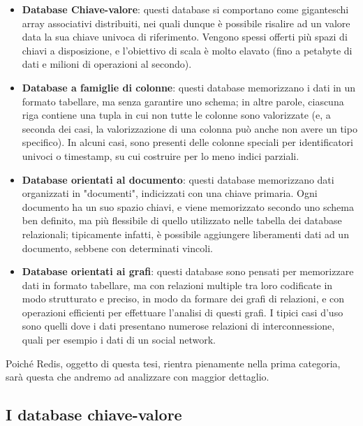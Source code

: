 \begin{itemize}
	\medskip
	\item
	\textbf{Database Chiave-valore}: questi database si comportano come giganteschi array
	associativi distribuiti, nei quali dunque è possibile risalire ad un valore data la
	sua chiave univoca di riferimento. Vengono spessi offerti più spazi di chiavi
	a disposizione, e l'obiettivo di scala è molto elavato (fino a petabyte di dati
	e milioni di operazioni al secondo).

	\item
	\textbf{Database a famiglie di colonne}: questi database memorizzano i dati in un formato
	tabellare, ma senza garantire uno schema; in altre parole, ciascuna riga contiene
	una tupla in cui non tutte le colonne sono valorizzate (e, a seconda dei casi, la
	valorizzazione di una colonna può anche non avere un tipo specifico). In alcuni
	casi, sono presenti delle colonne speciali per identificatori univoci o timestamp,
	su cui costruire per lo meno indici parziali.

	\item
	\textbf{Database orientati al documento}: questi database memorizzano dati organizzati in
	"documenti", indicizzati con una chiave primaria. Ogni documento ha un suo spazio
	chiavi, e viene memorizzato secondo uno schema ben definito, ma più flessibile
	di quello utilizzato nelle tabella dei database relazionali; tipicamente infatti,
	è possibile aggiungere liberamenti dati ad un documento, sebbene con determinati
	vincoli.

	\item
	\textbf{Database orientati ai grafi}: questi database sono pensati per memorizzare dati
	in formato tabellare, ma con relazioni multiple tra loro codificate in modo
	strutturato e preciso, in modo da formare dei grafi di relazioni, e con operazioni
	efficienti per effettuare l'analisi di questi grafi. I tipici casi d'uso sono
	quelli dove i dati presentano numerose relazioni di interconnessione, quali per
	esempio i dati di un social network.
\end{itemize}

Poiché Redis, oggetto di questa tesi, rientra pienamente nella prima categoria, sarà
questa che andremo ad analizzare con maggior dettaglio.


\subsection{I database chiave-valore}

